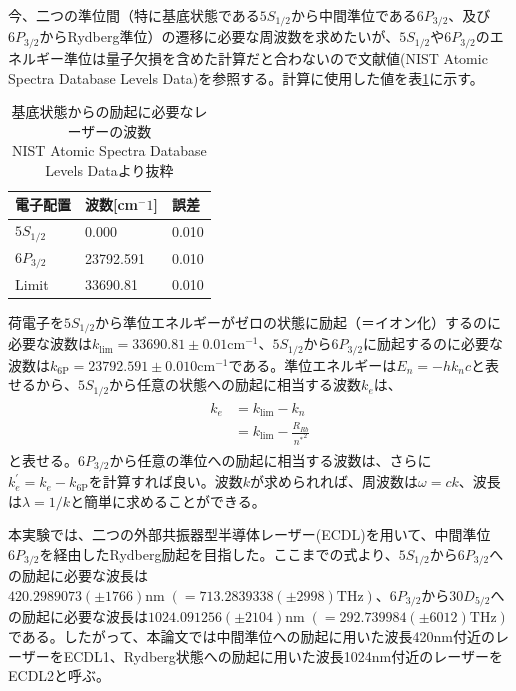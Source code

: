 \documentclass[dvipdfmx]{jsarticle}
\begin{document}
今、二つの準位間（特に基底状態である$5S_{1/2}$から中間準位である$6P_{3/2}$、及び$6P_{3/2}$からRydberg準位）の遷移に必要な周波数を求めたいが、$5S_{1/2}$や$6P_{3/2}$のエネルギー準位は量子欠損を含めた計算だと合わないので文献値\cite{nist}(NIST Atomic Spectra Database Levels Data)を参照する。計算に使用した値を表\ref{table:nist}に示す。
\begin{table}[hbtp]
  \caption{基底状態からの励起に必要なレーザーの波数 \\
  NIST Atomic Spectra Database Levels Data\cite{nist}より抜粋}
  \label{table:nist}
  \centering
  \begin{tabular}{lll}
    \hline
    電子配置  & 波数[cm$^-1$] & 誤差 \\
    \hline
    \hline
    $5S_{1/2}$ & 0.000 & 0.010 \\
    $6P_{3/2}$ & 23792.591 & 0.010 \\
    Limit & 33690.81 & 0.010 \\
    \hline
  \end{tabular}
\end{table}

荷電子を$5S_{1/2}$から準位エネルギーがゼロの状態に励起（＝イオン化）するのに必要な波数は$k_{\text{lim}} = 33690.81 \pm 0.01\text{cm}^{-1}$、$5S_{1/2}$から$6P_{3/2}$に励起するのに必要な波数は$k_{\text{6P}} = 23792.591 \pm 0.010\text{cm}^{-1}$である。準位エネルギーは$E_n = -hk_nc$と表せるから、$5S_{1/2}$から任意の状態への励起に相当する波数$k_e$は、
\begin{align}
\begin{split}
\label{rydberg-frequency}
k_e &= k_{\text{lim}} - k_n \\
&= k_{\text{lim}} - \frac{R_{Rb}}{{n^*}^2}
\end{split}
\end{align}
と表せる。$6P_{3/2}$から任意の準位への励起に相当する波数は、さらに$k_e^{'} = k_e - k_{\text{6P}}$を計算すれば良い。波数$k$が求められれば、周波数は$\omega = ck$、波長は$\lambda = 1 / k$と簡単に求めることができる。

本実験では、二つの外部共振器型半導体レーザー(ECDL)を用いて、中間準位$6P_{3/2}$を経由したRydberg励起を目指した。ここまでの式より、$5S_{1/2}$から$6P_{3/2}$への励起に必要な波長は$420.2989073(\pm 1766)\text{nm}\; \left(= 713.2839338(\pm 2998)\text{THz} \right)$、$6P_{3/2}$から$30D_{5/2}$への励起に必要な波長は$1024.091256(\pm 2104)\text{nm}\; \left(= 292.739984(\pm 6012)\text{THz} \right)$である。したがって、本論文では中間準位への励起に用いた波長420nm付近のレーザーをECDL1、Rydberg状態への励起に用いた波長1024nm付近のレーザーをECDL2と呼ぶ。
\end{document}

